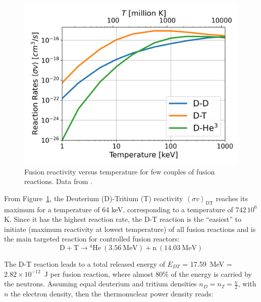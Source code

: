 \begin{figure} 
	\begin{center}
		\includegraphics[width=1.0\textwidth]{figures/chap1/Fusion_Reactivity.png}
		\caption{Fusion reactivity versus temperature for few couples of fusion reactions. Data from .}
		\label{fig:chap1:reactivity}
	\end{center}
\end{figure}

From Figure~\ref{fig:chap1:reactivity}, the Deuterium (D)-Tritium (T) reactivity $\left<\sigma v\right>_{\mathrm{DT}}$ reaches its maximum for a temperature of 64 keV, corresponding to a temperature of $742\,10^6$ K. Since it has the highest reaction rate, the D-T reaction is the “easiest” to initiate (maximum reactivity at lowest temperature) of all fusion reactions and is the main targeted reaction for controlled fusion reactors: 
\begin{equation}
	\mathrm{D + T} \longrightarrow \mathrm{{}^4 He~(3.56~MeV) + n~(14.03~MeV)}
\end{equation}

The D-T reaction leads to a total released energy of $E_{DT}$ = 17.59~\si{MeV} = $2.82\times 10^{-12}$~\si{J} per fusion reaction, where almost 80\% of the energy is carried by the neutrons. Assuming equal deuterium and tritium densities $n_D = n_T = \frac{n}{2}$, with $n$ the electron density, then the thermonuclear power density reads:

